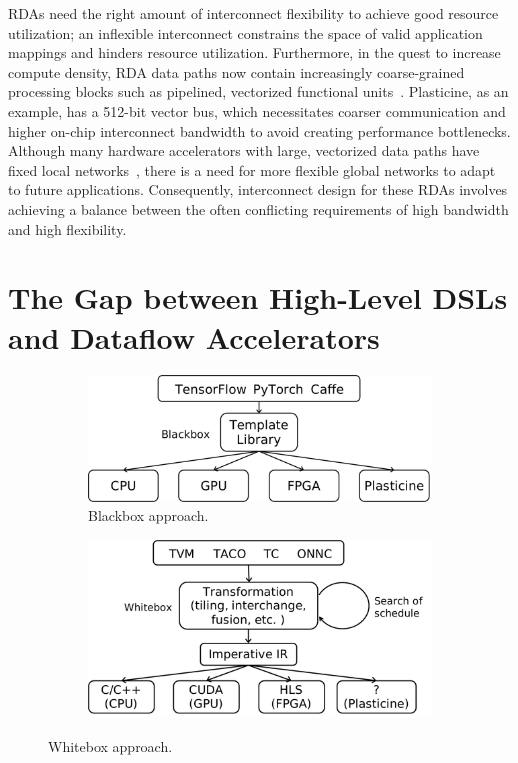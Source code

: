 RDAs need the right amount of interconnect flexibility to achieve good resource utilization; 
an inflexible interconnect constrains the space of
valid application mappings and hinders resource utilization. 
Furthermore, 
in the quest to increase compute density, RDA data paths now 
contain increasingly coarse-grained processing blocks such as pipelined, vectorized functional 
units~\cite{plasticine, piperench, xilinx-acap}.
Plasticine, as an example, has a 512-bit vector bus, which necessitates coarser communication and higher on-chip interconnect bandwidth to avoid creating performance bottlenecks. 
Although many hardware accelerators with large, vectorized data paths have fixed local networks~\cite{brainwave}, there is a need for more
flexible global networks to adapt to future applications.
Consequently, interconnect design for these RDAs involves achieving a balance between the often conflicting requirements of high bandwidth and high flexibility.

\section{The Gap between High-Level DSLs and Dataflow Accelerators}

\begin{figure}
\centering
\begin{subfigure}[b]{0.48\textwidth}
\centering
\includegraphics[width=1\textwidth]{figs/blackbox.pdf}
\caption{
  Blackbox approach.
}
\end{subfigure}
\hfill
\begin{subfigure}[b]{0.48\textwidth}
\centering
\includegraphics[width=1\textwidth]{figs/whitebox.pdf}
\caption{
}
\end{subfigure}
\caption[Big picture of accelerator compiler stack]{
  Whitebox approach.
}
\label{fig:bigpic}
\end{figure}

